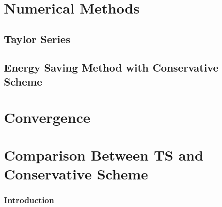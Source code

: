 \documentclass{beamer}
\begin{document}





\section{Numerical Methods}
\subsection{Taylor Series}
\subsection{Energy Saving Method with Conservative Scheme}

\section{Convergence}

\section{Comparison Between TS and Conservative Scheme}

\begin{frame}
\frametitle{Introduction}

\end{frame}
\end{document}
